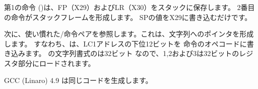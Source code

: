 
第1の命令 ()は、\ac{FP}（X29）および\ac{LR}（X30）をスタックに保存します。 
2番目の命令がスタックフレームを形成します。 
\ac{SP}の値をX29に書き込むだけです。

次に、使い慣れた/\ADD 命令ペアを参照します。これは、文字列へのポインタを形成します。 
すなわち、は、LC1アドレスの下位12ビットを \ADD 命令のオペコードに書き込みます。
\printf の文字列書式のは32ビット \Tint なので、1,2および3は32ビットのレジスタ部分にロードされます。

\Optimizing GCC (Linaro) 4.9 は同じコードを生成します。
